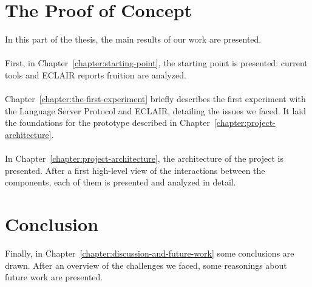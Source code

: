 \documentclass[12pt, a4paper, twoside]{book}
\begin{document}
\part{The Proof of Concept}\label{part:the-proof-of-concept}
In this part of the thesis, the main results of our work are presented. 
\\\\
First, in Chapter~\ref{chapter:starting-point}, the starting point is presented: current tools and ECLAIR reports fruition are analyzed.
\\\\
Chapter~\ref{chapter:the-first-experiment} briefly describes the first experiment with the Language Server Protocol and ECLAIR, detailing the issues we faced. It laid the foundations for the prototype described in Chapter~\ref{chapter:project-architecture}.
\\\\
In Chapter~\ref{chapter:project-architecture}, the architecture of the project is presented. After a first high-level view of the interactions between the components, each of them is presented and analyzed in detail.





\part{Conclusion}
Finally, in Chapter~\ref{chapter:discussion-and-future-work} some conclusions are drawn. 
After an overview of the challenges we faced, some reasonings about future work are presented.



%
\nocite{*}

%

%
\end{document}
